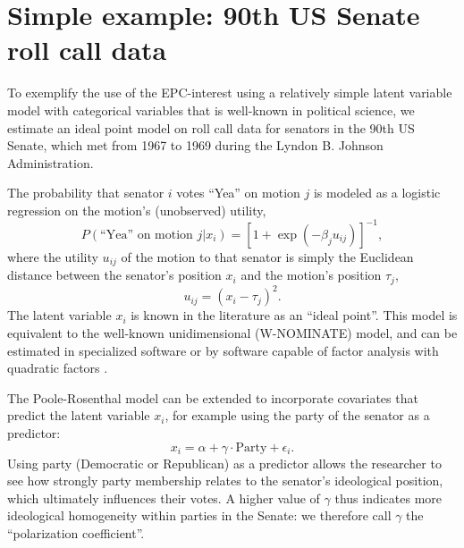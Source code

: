 \documentclass[12pt]{article}
\begin{document}
\section{Simple example: 90th US Senate roll call data}

To exemplify the use of the EPC-interest using a relatively simple latent variable model with categorical variables that is well-known in political science, we estimate an ideal point model on roll call data \citep{jackman2010pscl} for senators in the 90th US Senate, which met from 1967 to 1969 during the Lyndon B. Johnson Administration. 

The probability that senator $i$ votes ``Yea'' on motion $j$ is modeled as a logistic regression on the motion's (unobserved) utility, 
\begin{equation}
	P(\text{``Yea'' on motion } j | x_i) = [1 + \exp(-\beta_j u_{ij})]^{-1},
	\label{eq:vote-nodif}
\end{equation}
where the utility $u_{ij}$ of the motion to that senator is simply the Euclidean distance between the senator's position $x_i$ and the motion's position $\tau_j$,
\begin{equation}
	u_{ij} = (x_{i} - \tau_{j})^2.
\end{equation}
The latent variable $x_i$ is known in the literature as an ``ideal point''. This model is equivalent to the well-known unidimensional \citet{poole1985spatial} (W-NOMINATE) model, and can be estimated in specialized software \citep[e.g.][]{poole2008scaling} or by software capable of  factor analysis with quadratic factors \citep{maraun2001extra}. 


The Poole-Rosenthal model can be extended to incorporate covariates that predict the latent variable $x_i$, for example using the party of the senator as a predictor: 
\begin{equation}
	x_i = \alpha + \gamma \cdot \text{Party} + \epsilon_i.
	\label{eq:party-dimension}
\end{equation}
Using party (Democratic or Republican) as a predictor allows the researcher to see how strongly  party membership relates to the senator's ideological position, which ultimately influences their votes. A higher value of $\gamma$ thus indicates more ideological homogeneity  within parties in the Senate: we therefore call $\gamma$ the ``polarization coefficient''.  
\end{document}

